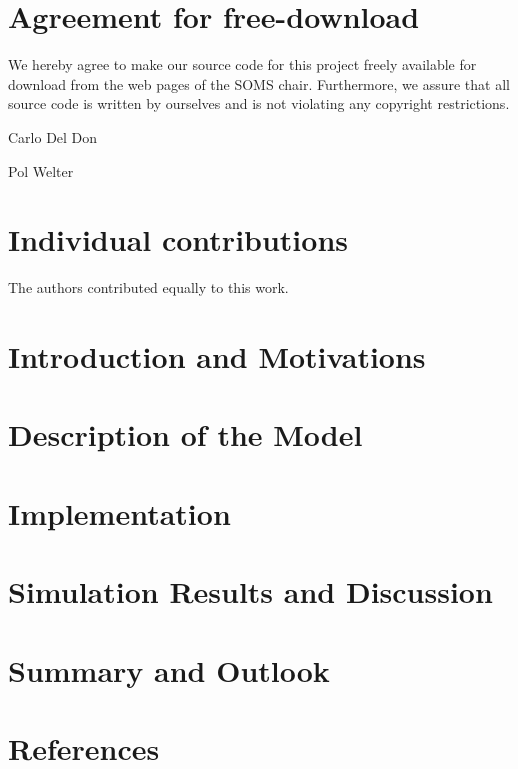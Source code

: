 




\begin{abstract}

\end{abstract}
\newpage


\newpage
\section*{Agreement for free-download}
\bigskip\bigskip

\large We hereby agree to make our source code for this project freely available for download from the web pages of the SOMS chair. Furthermore, we assure that all source code is written by ourselves and is not violating any copyright restrictions.

\begin{minipage}[t][2cm][b]{0.45\textwidth}
    \centering Carlo Del Don
\end{minipage}
\begin{minipage}[t][2cm][b]{0.45\textwidth}
    \centering Pol Welter
\end{minipage}

\vspace{5cm}
\section*{Individual contributions}
\bigskip\bigskip
The authors contributed equally to this work.

\newpage



\tableofcontents

\newpage

\section{Introduction and Motivations}

\section{Description of the Model}

\section{Implementation}

\section{Simulation Results and Discussion}

\section{Summary and Outlook}

\section{References}






  



 
